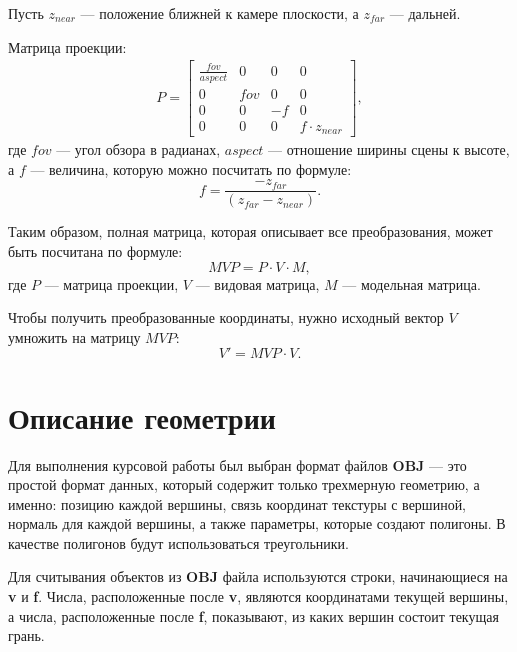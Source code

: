 Пусть $z_{near}$ --- положение ближней к камере плоскости, а $z_{far}$ --- дальней.

Матрица проекции:
\begin{equation}
\begin{gathered}
P = 
	\begin{bmatrix}
		\frac{fov}{aspect} & 0 & 0 & 0 \\
		0 & fov & 0 & 0 \\
		0 & 0 & -f & 0 \\
		0 & 0 & 0 & f \cdot z_{near}
	\end{bmatrix},
\end{gathered}
\end{equation}
где $fov$ --- угол обзора в радианах, $aspect$ --- отношение ширины сцены к высоте, а $f$ --- величина, которую можно посчитать по формуле:
\begin{equation}
f = \frac{-z_{far}}{(z_{far} - z_{near})}.
\end{equation}

Таким образом, полная матрица, которая описывает все преобразования, может быть посчитана по формуле:
\begin{equation}
MVP = P \cdot V \cdot M,
\end{equation}
где $P$ --- матрица проекции, $V$ --- видовая матрица, $M$ --- модельная матрица.

Чтобы получить преобразованные координаты, нужно исходный вектор $V$ умножить на матрицу $MVP$:
\begin{equation}
V' = MVP \cdot V.
\end{equation}
    
\section{Описание геометрии}
\label{sec:geometry}

Для выполнения курсовой работы был выбран формат файлов \textbf{OBJ} --- это простой формат данных, который содержит только трехмерную геометрию, а именно: позицию каждой вершины, связь координат текстуры с вершиной, нормаль для каждой вершины, а также параметры, которые создают полигоны. 
В качестве полигонов будут использоваться треугольники.

Для считывания объектов из \textbf{OBJ} файла используются строки, начинающиеся на \textbf{v} и \textbf{f}. 
Числа, расположенные после \textbf{v}, являются координатами текущей вершины, а числа, расположенные после \textbf{f}, показывают, из каких вершин состоит текущая грань.

